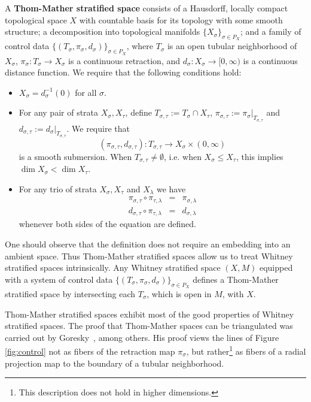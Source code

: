 \begin{defn}
	A \textbf{Thom-Mather stratified space} consists of a Hausdorff, locally compact topological space $X$ with countable basis for its topology with some smooth structure; a decomposition into topological manifolds $\{X_{\sigma}\}_{\sigma\in P_X}$; and a family of control data $\{(T_{\sigma},\pi_{\sigma},d_{\sigma})\}_{\sigma\in P_X}$, where $T_{\sigma}$ is an open tubular neighborhood of $X_{\sigma}$, $\pi_{\sigma}:T_{\sigma}\to X_{\sigma}$ is a continuous retraction, and $d_{\sigma}:X_{\sigma}\to [0,\infty)$ is a continuous distance function. We require that the following conditions hold:
	\begin{itemize}
		\item $X_{\sigma}=d_{\sigma}^{-1}(0)$ for all $\sigma$.
		\item For any pair of strata $X_{\sigma}, X_{\tau}$, define $T_{\sigma,\tau}:=T_{\sigma}\cap X_{\tau}$, $\pi_{\sigma,\tau}:=\pi_{\sigma}|_{T_{\sigma,\tau}}$ and $d_{\sigma,\tau}:=d_{\sigma}|_{T_{\sigma,\tau}}$. We require that
		\[
			(\pi_{\sigma,\tau},d_{\sigma,\tau}): T_{\sigma,\tau}\to X_{\sigma}\times (0,\infty)
		\]
		is a smooth submersion. When $T_{\sigma,\tau}\neq\emptyset$, i.e. when $X_{\sigma}\leq X_{\tau}$, this implies $\dim X_{\sigma} < \dim X_{\tau}$.
		\item For any trio of strata $X_{\sigma}, X_{\tau}$ and $X_{\lambda}$ we have
		\begin{eqnarray*}
			\pi_{\sigma,\tau}\circ \pi_{\tau,\lambda}&=&\pi_{\sigma,\lambda} \\
			d_{\sigma,\tau}\circ \pi_{\tau,\lambda}&=& d_{\sigma,\lambda}
		\end{eqnarray*}
		whenever both sides of the equation are defined.
	\end{itemize}
\end{defn}
\begin{rmk}
	One should observe that the definition does not require an embedding into an ambient space. Thus Thom-Mather stratified spaces allow us to treat Whitney stratified spaces intrinsically. Any Whitney stratified space $(X,M)$ equipped with a system of control data $\{(T_{\sigma},\pi_{\sigma},d_{\sigma})\}_{\sigma\in P_X}$ defines a Thom-Mather stratified space by intersecting each $T_{\sigma}$, which is open in $M$, with $X$.
\end{rmk}

Thom-Mather stratified spaces exhibit most of the good properties of Whitney stratified spaces. The proof that Thom-Mather spaces can be triangulated was carried out by Goresky~\cite{goresky-fol}, among others. His proof views the lines of Figure \ref{fig:control} not as fibers of the retraction map $\pi_{\sigma}$, but rather\footnote{This description does not hold in higher dimensions.} as fibers of a radial projection map to the boundary of a tubular neighborhood.

